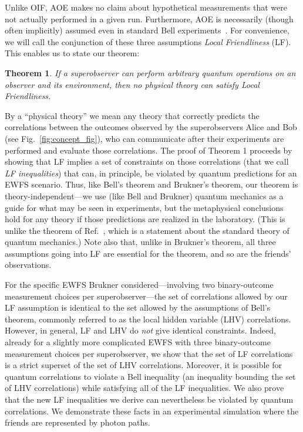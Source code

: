 \documentclass[aps,prx,twocolumn,superscriptaddress]{revtex4-1}
\theoremstyle{plain}
\newtheorem{thm}{Theorem}
\begin{document}
Unlike OIF, AOE makes no claim about hypothetical measurements that were not actually performed in a given run. Furthermore, AOE is necessarily (though often implicitly) assumed even in standard Bell experiments~\cite{Causarum}. For convenience, we will call the conjunction of these three 
assumptions \textit{{Local Friendliness}} (LF). This enables us to state our theorem: 
\begin{thm}\label{theorem_1}
    If a superobserver can perform arbitrary quantum operations on an observer and its environment, then no physical theory can satisfy Local Friendliness.
\end{thm}
By a ``physical theory'' we mean any theory that correctly predicts the correlations between the outcomes observed by the superobservers Alice and Bob (see Fig.~\ref{fig:concept_fig}), who can communicate after their experiments are performed and evaluate those correlations. The proof of Theorem 1 proceeds by showing that LF implies a set of constraints on those correlations (that we call \emph{LF inequalities}) that can, in principle, be violated by quantum predictions for an EWFS scenario. Thus, like Bell's theorem and Brukner's theorem, our theorem is theory-independent---we use (like Bell and Brukner) quantum mechanics as a guide for what may be seen in experiments, but the metaphysical conclusions hold for any theory if those predictions are realized in the laboratory. (This is unlike the theorem of Ref.~\cite{FR}, which is a statement about the standard theory of quantum mechanics.) Note also that, unlike in Brukner's theorem, all three assumptions going into LF are essential for the theorem, and so are the friends' observations.

For the specific EWFS Brukner considered---involving two binary-outcome measurement choices per superobserver---the  set of correlations allowed by our LF assumption is identical to the set allowed by the assumptions of Bell's theorem, commonly referred to as the local hidden variable (LHV) correlations. However, in general, LF and LHV do {\em not} give identical constraints.  
Indeed, already for a slightly more complicated EWFS with three binary-outcome measurement choices per superobserver, we show that the set of LF correlations is a strict superset of the set of LHV correlations. Moreover, it is possible for quantum correlations to violate a Bell inequality (an inequality bounding the set of LHV correlations) while satisfying all of the LF inequalities. We also prove that the new LF inequalities we derive can nevertheless be violated by quantum correlations. We demonstrate these facts in an experimental simulation where the friends are represented by photon paths. 
\end{document}

